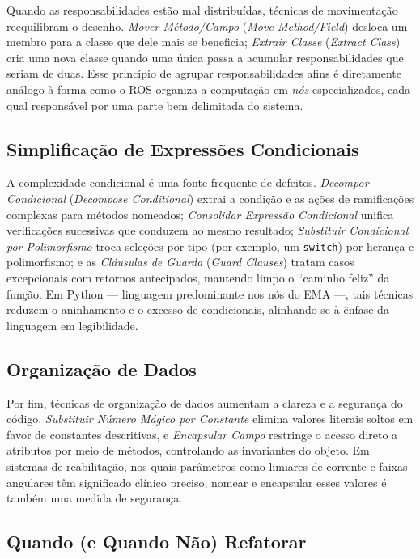 Quando as responsabilidades estão mal distribuídas, técnicas de movimentação reequilibram o
desenho. \emph{Mover Método/Campo} (\emph{Move Method/Field}) desloca um membro para a
classe que dele mais se beneficia; \emph{Extrair Classe} (\emph{Extract Class}) cria uma
nova classe quando uma única passa a acumular responsabilidades que seriam de duas. Esse
princípio de agrupar responsabilidades afins é diretamente análogo à forma como o ROS
organiza a computação em \emph{nós} especializados, cada qual responsável por uma parte bem
delimitada do sistema.

\subsection{Simplificação de Expressões Condicionais}

A complexidade condicional é uma fonte frequente de defeitos. \emph{Decompor Condicional}
(\emph{Decompose Conditional}) extrai a condição e as ações de ramificações complexas para
métodos nomeados; \emph{Consolidar Expressão Condicional} unifica verificações sucessivas
que conduzem ao mesmo resultado; \emph{Substituir Condicional por Polimorfismo} troca
seleções por tipo (por exemplo, um \texttt{switch}) por herança e polimorfismo; e as
\emph{Cláusulas de Guarda} (\emph{Guard Clauses}) tratam casos excepcionais com retornos
antecipados, mantendo limpo o ``caminho feliz'' da função. Em Python --- linguagem
predominante nos nós do EMA ---, tais técnicas reduzem o aninhamento e o excesso de
condicionais, alinhando-se à ênfase da linguagem em legibilidade.

\subsection{Organização de Dados}

Por fim, técnicas de organização de dados aumentam a clareza e a segurança do código.
\emph{Substituir Número Mágico por Constante} elimina valores literais soltos em favor de
constantes descritivas, e \emph{Encapsular Campo} restringe o acesso direto a atributos por
meio de métodos, controlando as invariantes do objeto. Em sistemas de reabilitação, nos
quais parâmetros como limiares de corrente e faixas angulares têm significado clínico
preciso, nomear e encapsular esses valores é também uma medida de segurança.

\subsection{Quando (e Quando Não) Refatorar}


